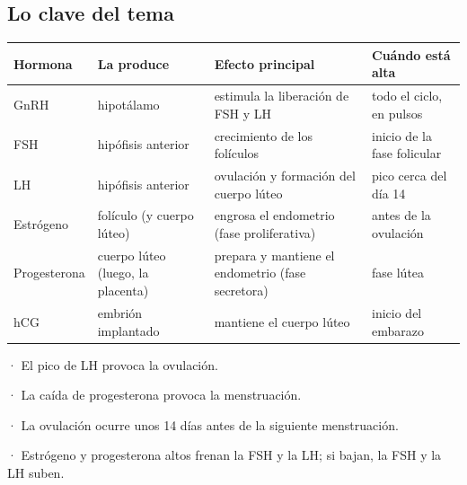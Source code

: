\subsection{Lo clave del tema}
\begin{center}\small
\begin{tabularx}{\linewidth}{@{}>{\raggedright\arraybackslash\hsize=0.52\hsize}X>{\raggedright\arraybackslash\hsize=1.15\hsize}X>{\raggedright\arraybackslash\hsize=1.39\hsize}X>{\raggedright\arraybackslash\hsize=0.94\hsize}X@{}}
\toprule
\textbf{Hormona} & \textbf{La produce} & \textbf{Efecto principal} & \textbf{Cuándo está alta} \\
\midrule
GnRH & hipotálamo & estimula la liberación de FSH y LH & todo el ciclo, en pulsos \\
FSH & hipófisis anterior & crecimiento de los folículos & inicio de la fase folicular \\
LH & hipófisis anterior & ovulación y formación del cuerpo lúteo & pico cerca del día 14 \\
Estrógeno & folículo (y cuerpo lúteo) & engrosa el endometrio (fase proliferativa) & antes de la ovulación \\
Progesterona & cuerpo lúteo (luego, la placenta) & prepara y mantiene el endometrio (fase secretora) & fase lútea \\
hCG & embrión implantado & mantiene el cuerpo lúteo & inicio del embarazo \\
\bottomrule
\end{tabularx}
\end{center}
 
\begin{clave}[{Recuerda}] · El pico de LH provoca la ovulación.\par · La caída de progesterona provoca la menstruación.\par · La ovulación ocurre unos 14 días antes de la siguiente menstruación.\par · Estrógeno y progesterona altos frenan la FSH y la LH; si bajan, la FSH y la LH suben.\end{clave}
 
